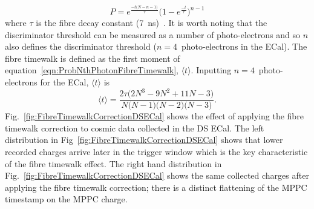 {\begin{equation}
P = e^{\frac{-t\big(N-n-1\big)}{\tau}}\big(1-e^{\frac{-t}{\tau}}\big)^{n-1}
\label{eqn:ProbNthPhotonFibreTimewalk}
\end{equation}
where $\tau$ is the fibre decay constant (7~ns)~\cite{ND280CalibTN}.  It is worth noting that the discriminator threshold can be measured as a number of photo-electrons and so $n$ also defines the discriminator threshold ($n=4$~photo-electrons in the ECal).  The fibre timewalk is defined as the first moment of equation~\ref{eqn:ProbNthPhotonFibreTimewalk}, $\langle t \rangle$.  Inputting $n=4$~photo-electrons for the ECal, $\langle t \rangle$ is 
\begin{equation}
\langle t \rangle = \frac{2\tau\big(2N^3-9N^2+11N-3\big)}{N\big(N-1\big)\big(N-2\big)\big(N-3\big)}.
\end{equation}
Fig.~\ref{fig:FibreTimewalkCorrectionDSECal} shows the effect of applying the fibre timewalk correction to cosmic data collected in the DS ECal.  The left distribution in Fig~\ref{fig:FibreTimewalkCorrectionDSECal} shows that lower recorded charges arrive later in the trigger window which is the key characteristic of the fibre timewalk effect.  The right hand distribution in Fig.~\ref{fig:FibreTimewalkCorrectionDSECal} shows the same collected charges after applying the fibre timewalk correction; there is a distinct flattening of the MPPC timestamp on the MPPC charge.}
